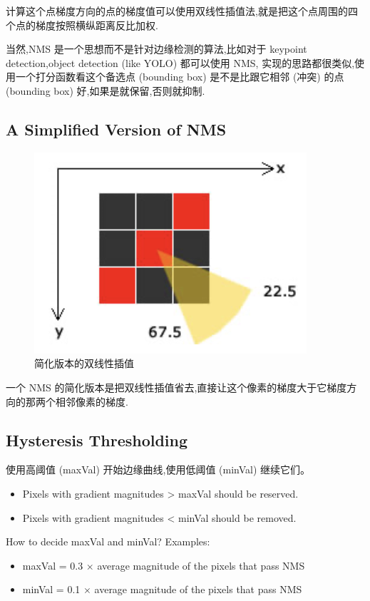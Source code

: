 计算这个点梯度方向的点的梯度值可以使用双线性插值法,就是把这个点周围的四个点的梯度按照横纵距离反比加权.

当然,NMS 是一个思想而不是针对边缘检测的算法,比如对于 keypoint detection,object detection (like YOLO) 都可以使用 NMS,
实现的思路都很类似,使用一个打分函数看这个备选点 (bounding box) 是不是比跟它相邻 (冲突) 的点 (bounding box) 好,如果是就保留,否则就抑制.

\subsection{A Simplified Version of NMS}

\begin{figure}[htbp]
    \centering
	\includegraphics[scale=0.55]{figures/simple_NMS.png}
	\caption{简化版本的双线性插值}
\end{figure}

一个 NMS 的简化版本是把双线性插值省去,直接让这个像素的梯度大于它梯度方向的那两个相邻像素的梯度.

\subsection{Hysteresis Thresholding}

使用高阈值 (maxVal) 开始边缘曲线,使用低阈值 (minVal) 继续它们。

\begin{itemize}
    \item Pixels with gradient magnitudes > maxVal should be reserved.
    \item Pixels with gradient magnitudes < minVal should be removed.
\end{itemize}

How to decide maxVal and minVal? Examples:

\begin{itemize}
    \item maxVal = 0.3 $\times$ average magnitude of the pixels that pass NMS
    \item minVal = 0.1 $\times$ average magnitude of the pixels that pass NMS
\end{itemize}
